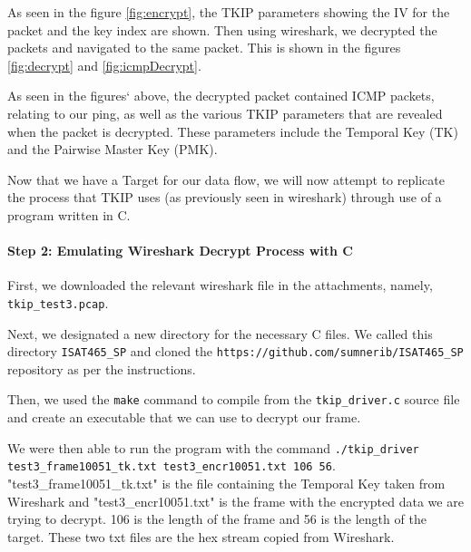 \documentclass[main.tex]{subfiles}
\begin{document}

As seen in the figure \ref{fig:encrypt}, the TKIP parameters showing the IV for the packet and the key index are shown. Then using wireshark, we decrypted the packets and navigated to the same packet. This is shown in the figures \ref{fig:decrypt} and \ref{fig:icmpDecrypt}.





As seen in the figures` above, the decrypted packet contained ICMP packets, relating to our ping, as well as the various TKIP parameters that are revealed when the packet is decrypted. These parameters include the Temporal Key (TK) and the Pairwise Master Key (PMK).

Now that we have a Target for our data flow, we will now attempt to replicate the process that TKIP uses (as previously seen in wireshark) through use of a program written in C.

\paragraph{Step 2: Emulating Wireshark Decrypt Process with C}
\hfill \break
\noindent 

First, we downloaded the relevant wireshark file in the attachments, namely, \texttt{tkip\_test3.pcap}.

Next, we designated a new directory for the necessary C files. We called this directory \texttt{ISAT465\_SP} and cloned the \texttt{https://github.com/sumnerib/ISAT465\_SP} repository as per the instructions.


Then, we used the \texttt{make} command to compile from the \texttt{tkip\_driver.c} source file and create an executable that we can use to decrypt our frame.

We were then able to run the program with the command \texttt{./tkip\_driver test3\_frame10051\_tk.txt test3\_encr10051.txt 106 56}. "test3\_frame10051\_tk.txt" is the file containing the Temporal Key taken from Wireshark and "test3\_encr10051.txt" is the frame with the encrypted data we are trying to decrypt. 106 is the length of the frame and 56 is the length of the target. These two txt files are the hex stream copied from Wireshark.
\end{document}
